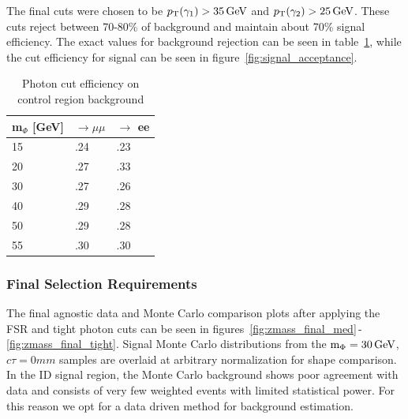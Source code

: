 The final cuts were chosen to be $p_\mathrm{T}(\gamma_1)>35\,\text{Ge\hspace{-.08em}V}$ and $p_\mathrm{T}(\gamma_2)>25\,\text{Ge\hspace{-.08em}V}$. These cuts reject between 70-80\% of background and maintain about 70\% signal efficiency. The exact values for background rejection can be seen in table~\ref{tab:cuts_pt}, while the cut efficiency for signal can be seen in figure~\ref{fig:signal_acceptance}.

\begin{table}[htb!]
	\begin{center}
		\caption[Photon \pt cut efficiency on control region background]{Photon \pt cut efficiency on control region background}
		\label{tab:cuts_pt}
		\begin{tabular}{l|l|l}
			\hline
			m$_{\Phi}$ [GeV] & \PZ $\rightarrow \mu \mu$  & \PZ $\rightarrow$ ee\\
			\hline
			15	&	.24	&	.23 \\	
			\hline
			20	&	.27	&	.33 \\
			\hline
			30	&	.27	&	.26 \\
			\hline
			40	&	.29	&	.28 \\
			\hline
			50	&	.29	&	.28 \\
			\hline
			55	&	.30	&	.30 \\
			\hline
		\end{tabular}
	\end{center}
\end{table}

\subsubsection{Final Selection Requirements} \label{sec:ana_final_selection}
The final \lxy agnostic data and Monte Carlo comparison plots after applying the FSR and tight photon \pt cuts can be seen in figures~\ref{fig:zmass_final_med}$\,$-$\,$\ref{fig:zmass_final_tight}. Signal Monte Carlo distributions from the $\text{m}_\Phi=30\,\text{Ge\hspace{-.08em}V}$, $c\tau=0\unit{mm}$ samples are overlaid at arbitrary normalization for shape comparison. In the ID signal region, the Monte Carlo background shows poor agreement with data and consists of very few weighted events with limited statistical power. For this reason we opt for a data driven method for background estimation.

